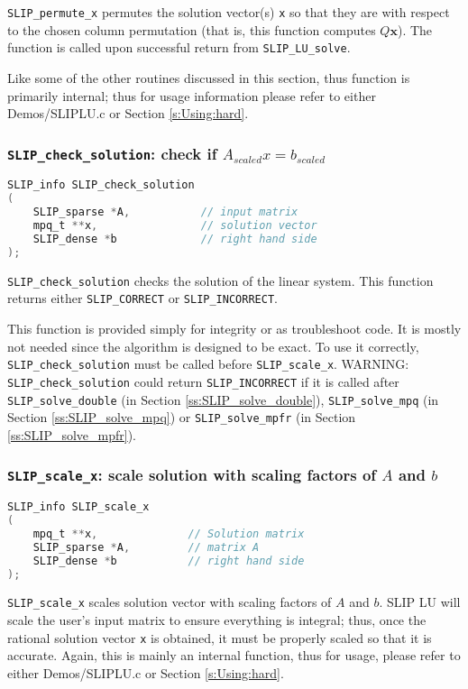 \documentclass[11pt]{article}
\theoremstyle{definition}
\begin{document}
\verb|SLIP_permute_x| permutes the solution vector(s) \verb|x| so that they are with respect to the chosen column permutation (that is, this function computes $Q \mathbf{x}$). The function is called upon successful return from \verb|SLIP_LU_solve|.


Like some of the other routines discussed in this section, thus function is primarily internal; thus for usage information please refer to either Demos/SLIPLU.c or Section \ref{s:Using:hard}.

\cprotect\subsubsection{\verb|SLIP_check_solution|: check if $A_{scaled}x=b_{scaled}$}


\begin{lstlisting}[language=C,frame=single]
SLIP_info SLIP_check_solution
(
    SLIP_sparse *A,           // input matrix
    mpq_t **x,                // solution vector
    SLIP_dense *b             // right hand side
);
\end{lstlisting}

\verb|SLIP_check_solution| checks the solution of the linear system. This function returns either \verb|SLIP_CORRECT| or \verb|SLIP_INCORRECT|.

This function is provided simply for integrity or as troubleshoot code. It is mostly not needed since the algorithm is designed to be exact. To use it correctly, \verb|SLIP_check_solution| must be called before \verb|SLIP_scale_x|. WARNING: \verb|SLIP_check_solution| could return \verb|SLIP_INCORRECT| if it is called after \verb|SLIP_solve_double| (in Section \ref{ss:SLIP_solve_double}), \verb|SLIP_solve_mpq| (in Section \ref{ss:SLIP_solve_mpq}) or \verb|SLIP_solve_mpfr| (in Section \ref{ss:SLIP_solve_mpfr}).


\cprotect\subsubsection{\verb|SLIP_scale_x|: scale solution with scaling factors of $A$ and $b$}\label{ss:SLIP_scale_x}


\begin{lstlisting}[language=C,frame=single]
SLIP_info SLIP_scale_x
(
    mpq_t **x,              // Solution matrix
    SLIP_sparse *A,         // matrix A
    SLIP_dense *b           // right hand side
);
\end{lstlisting}

\verb|SLIP_scale_x| scales solution vector with scaling factors of $A$ and $b$. SLIP LU will scale the user's input matrix to ensure everything is integral; thus, once the rational solution vector \verb|x| is obtained, it must be properly scaled so that it is accurate. Again, this is mainly an internal function, thus for usage, please refer to either Demos/SLIPLU.c or Section \ref{s:Using:hard}.
\end{document}
